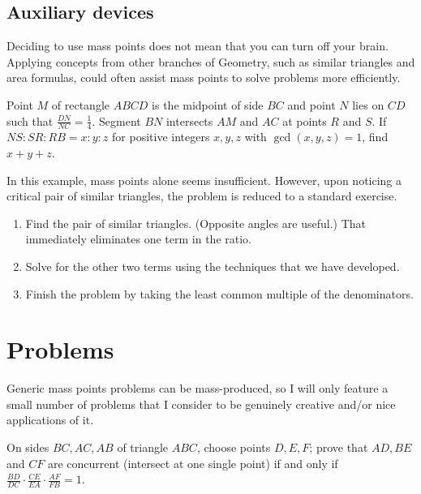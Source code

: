 \documentclass{article}
\begin{document}
\subsection{Auxiliary devices}
Deciding to use mass points does not mean that you can turn off your brain. Applying concepts from other branches of Geometry, such as similar triangles and area formulas, could often assist mass points to solve problems more efficiently.
\begin{exam}[MATHCOUNTS 2012]
Point $M$ of rectangle $ABCD$ is the midpoint of side $BC$ and point $N$ lies on $CD$ such that $\frac{DN}{NC}=\frac{1}{4}$. Segment $BN$ intersects $AM$ and $AC$ at points $R$ and $S$. If $NS:SR:RB = x:y:z$ for positive integers $x,y,z$ with $\gcd(x,y,z)=1$, find $x + y + z$.
\end{exam}
In this example, mass points alone seems insufficient. However, upon noticing a critical pair of similar triangles, the problem is reduced to a standard exercise.

\begin{walk}
\begin{enumerate}
\item Find the pair of similar triangles. (Opposite angles are useful.) That immediately eliminates one term in the ratio.
\item Solve for the other two terms using the techniques that we have developed.
\item Finish the problem by taking the least common multiple of the denominators.
\end{enumerate}
\end{walk}
\section{Problems}
Generic mass points problems can be mass-produced, so I will only feature a small number of problems that I consider to be genuinely creative and/or nice applications of it.

\bigskip
\noindent{}

\begin{req}{2}
\end{req}

\begin{prob}[Ceva]{1}
On sides $BC,AC,AB$ of triangle $ABC$, choose points $D,E,F$; prove that $AD,BE$ and $CF$ are concurrent (intersect at one single point) if and only if $\frac{BD}{DC}\cdot\frac{CE}{EA}\cdot\frac{AF}{FB}=1$.
\end{prob}
\end{document}

